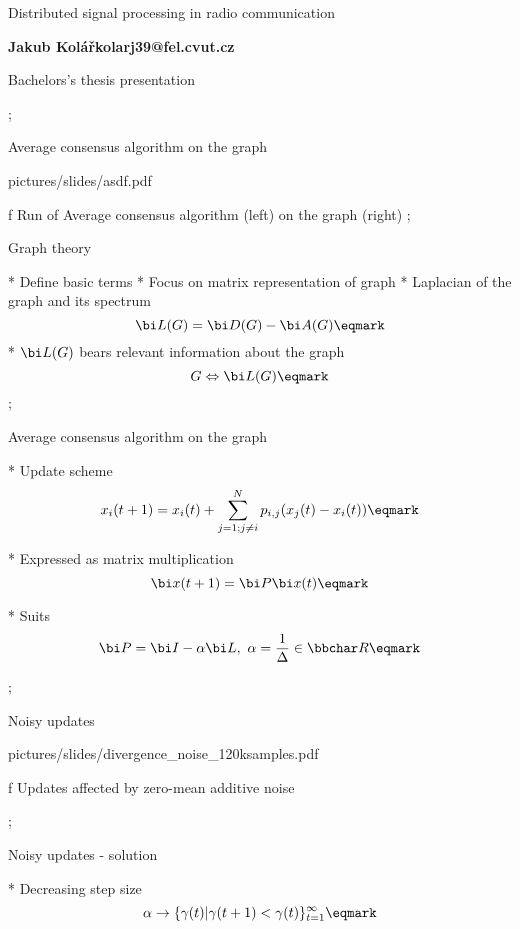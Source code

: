 

\worktype[B/EN]

\slideshow 

\tit Distributed signal processing \nl in radio communication

\subtit\bf Jakub Kolář\nl kolarj39@fel.cvut.cz

\subtit\rm Bachelors's thesis presentation

\pg; %

\sec Average consensus algorithm \nl on the graph


\medskip
\centerline{\picw=15cm \inspic pictures/slides/asdf.pdf } 
\caption/f { Run of Average consensus algorithm (left) on the graph (right)}
\pg;

\sec Graph theory

* Define basic terms
* Focus on matrix representation of graph
* Laplacian of the graph and its spectrum
  $$ {\bi L}(G) = {\bi D}(G) - {\bi A}(G) \eqmark $$
*  ${\bi L}(G)$ bears relevant information about the graph
$$ G \Leftrightarrow {\bi L}(G) \eqmark$$
\pg;

\sec Average consensus algorithm \nl on the graph

* Update scheme \nl $$ x_i(t+1) = x_i(t)+\sum_{j=1; j\not= i}^N p_{i,j}(x_j(t)-x_i(t)) \eqmark $$

* Expressed as matrix multiplication \nl $$ {\bi x}(t+1) = {\bi P} {\bi x}(t) \eqmark $$


* Suits $${\bi P} = {\bi I} - \alpha {\bi L}, \ \alpha = {{1}\over{\Delta}} \in \bbchar R \eqmark $$

\pg;



\sec Noisy updates



\centerline{\picw=13cm \inspic pictures/slides/divergence_noise_120ksamples.pdf } 
\caption/f Updates affected by zero-mean additive noise


\pg;



\sec Noisy updates - solution


* Decreasing step size \nl $$\alpha \rightarrow \{ \gamma(t) | \gamma(t+1)<\gamma(t)  \}_{t=1}^\infty \eqmark$$


